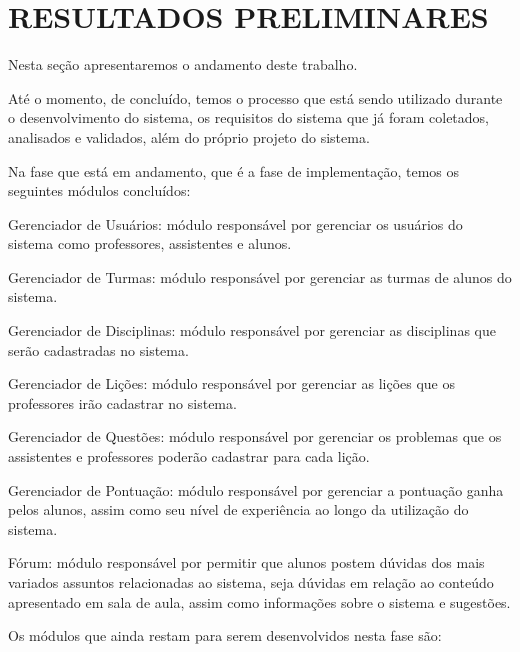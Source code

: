 \section{RESULTADOS PRELIMINARES}

Nesta seção apresentaremos o andamento deste trabalho.

Até o momento, de concluído, temos o processo que está sendo utilizado durante o desenvolvimento do sistema, os requisitos do sistema que já foram coletados, analisados e validados, além do próprio projeto do sistema. 

Na fase que está em andamento, que é a fase de implementação, temos os seguintes módulos concluídos: 

\begin{alineascomponto}
	\item Gerenciador de Usuários: módulo responsável por gerenciar os usuários do sistema como professores, assistentes e alunos.
	\item Gerenciador de Turmas: módulo responsável por gerenciar as turmas de alunos do sistema.
    \item Gerenciador de Disciplinas: módulo responsável por gerenciar as disciplinas que serão cadastradas no sistema.
    \item Gerenciador de Lições: módulo responsável por gerenciar as lições que os professores irão cadastrar no sistema.
    \item Gerenciador de Questões: módulo responsável por gerenciar os problemas que os assistentes e professores poderão cadastrar para cada lição.
    \item Gerenciador de Pontuação: módulo responsável por gerenciar a pontuação ganha pelos alunos, assim como seu nível de experiência ao longo da utilização do sistema. 
    \item Fórum: módulo responsável por permitir que alunos postem dúvidas dos mais variados  assuntos relacionadas ao sistema, seja dúvidas em relação ao conteúdo apresentado em sala de aula, assim como informações sobre o sistema e sugestões. 
\end{alineascomponto}

Os módulos que ainda restam para serem desenvolvidos nesta fase são:

